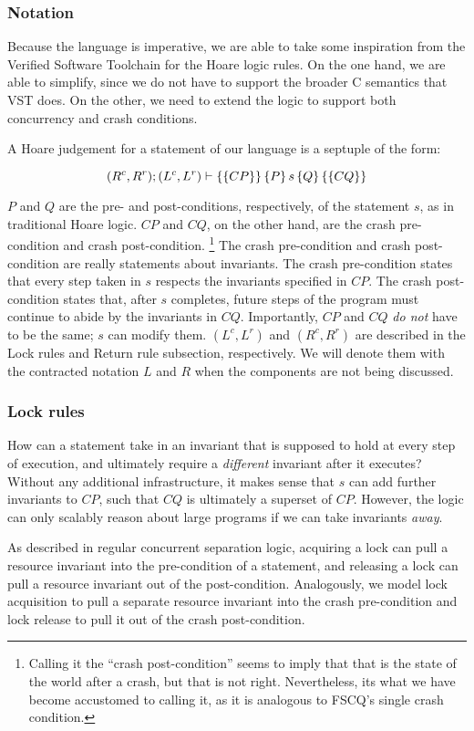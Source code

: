 \subsubsection{Notation}
Because the language is imperative, we are able to take some inspiration from
the Verified Software Toolchain for the Hoare logic rules.
On the one hand, we
are able to simplify, since we do not have to support the broader C semantics
that VST does.
On the other, we need to extend the logic to support both
concurrency and crash conditions.

A Hoare judgement for a statement of our language is a septuple of the form:

$$(R^c,R^r); (L^c,L^r) \vdash \left\{\left\{ CP \right\}\right\} \left\{ P \right\} s \left\{ Q \right\} \left\{\left\{ CQ \right\}\right\}$$

$P$ and $Q$ are the pre- and post-conditions, respectively, of the statement
$s$, as in traditional Hoare logic.
$CP$ and $CQ$, on the other hand, are the
crash pre-condition and crash post-condition.
\footnote{Calling it the ``crash
post-condition'' seems to imply that that is the state of the world after a
crash, but that is not right.
Nevertheless, its what we have become accustomed
to calling it, as it is analogous to FSCQ's single crash condition.}
The crash
pre-condition and crash post-condition are really statements about invariants.
The crash pre-condition states that every step taken in $s$ respects the
invariants specified in $CP$.
The crash post-condition states that, after $s$
completes, future steps of the program must continue to abide by the invariants
in $CQ$.
Importantly, $CP$ and $CQ$ \textit{do not} have to be the same; $s$
can modify them.
$(L^c,L^r)$ and $(R^c,R^r)$ are described in the Lock rules
and Return rule subsection, respectively.
We will denote them with the
contracted notation $L$ and $R$ when the components are not being discussed.

\subsubsection{Lock rules}

How can a statement take in an invariant that is supposed to hold at every step
of execution, and ultimately require a \textit{different} invariant after it
executes? Without any additional infrastructure, it makes sense that $s$ can add
further invariants to $CP$, such that $CQ$ is ultimately a superset of $CP$.
However, the logic can only scalably reason about large programs if we can
take invariants \textit{away}.

As described in regular concurrent separation logic, acquiring a lock can pull a
resource invariant into the pre-condition of a statement, and releasing a lock
can pull a resource invariant out of the post-condition.
Analogously, we model
lock acquisition to pull a separate resource invariant into the crash
pre-condition and lock release to pull it out of the crash post-condition.

